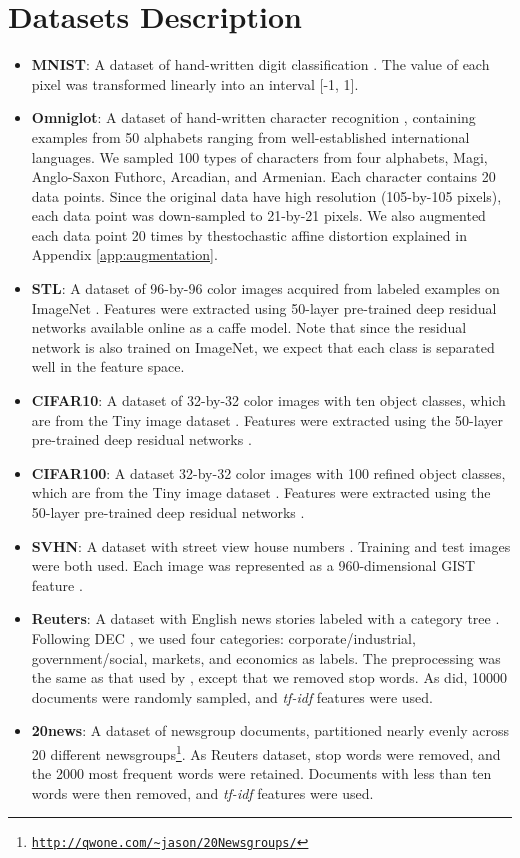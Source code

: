 \documentclass{article}
\theoremstyle{plain}
\begin{document}
\section{Datasets Description} \label{app:dataset}
\begin{itemize}
\item {\bf MNIST}: A dataset of hand-written digit classification \citep{lecun1998gradient}. The value of each pixel was transformed linearly into an interval [-1, 1].
\item {\bf Omniglot}: A dataset of hand-written character recognition \citep{lake2011one}, containing examples from 50 alphabets ranging from well-established international languages. We sampled 100 types of characters from four alphabets, Magi, Anglo-Saxon Futhorc, Arcadian, and Armenian. Each character contains 20 data points. Since the original data have high resolution (105-by-105 pixels), each data point was down-sampled to 21-by-21 pixels. We also augmented each data point 20 times by thestochastic affine distortion explained in Appendix \ref{app:augmentation}.
\item {\bf STL}: A dataset of 96-by-96 color images acquired from labeled examples on ImageNet \citep{coates2010analysis}. Features were extracted using 50-layer pre-trained deep residual networks \citep{he2016deep} available online as a caffe model. Note that since the residual network is also trained on ImageNet, we expect that each class is separated well in the feature space.
\item {\bf CIFAR10}: A dataset of 32-by-32 color images with ten object classes, which are from the Tiny image dataset \citep{torralba200880}. Features were extracted using the 50-layer pre-trained deep residual networks \citep{he2016deep}.
\item {\bf CIFAR100}:  A dataset 32-by-32 color images with 100 refined object classes, which are from the Tiny image dataset \citep{torralba200880}. Features were extracted using the 50-layer pre-trained deep residual networks \citep{he2016deep}.
\item {\bf SVHN}: A dataset with street view house numbers \citep{netzer2011reading}. Training and test images were both used. Each image was represented as a 960-dimensional GIST feature \citep{oliva2001modeling}.
\item {\bf Reuters}: A dataset with English news stories labeled with a category tree \citep{lewis2004rcv1}. Following DEC \citep{xie2016unsupervised}, we used four categories: corporate/industrial, government/social, markets, and economics as labels. The preprocessing was the same as that used by \citet{xie2016unsupervised}, except that we removed stop words. As \citet{xie2016unsupervised} did, 10000 documents were randomly sampled, and {\it tf-idf} features were used.
\item {\bf 20news}: A dataset of newsgroup documents, partitioned nearly evenly across 20 different newsgroups\footnote{{\tt \url{http://qwone.com/~jason/20Newsgroups/}}}. As Reuters dataset, stop words were removed, and the 2000 most frequent words were retained. Documents with less than ten words were then removed, and {\it tf-idf} features were used.
\end{itemize}
\end{document}
